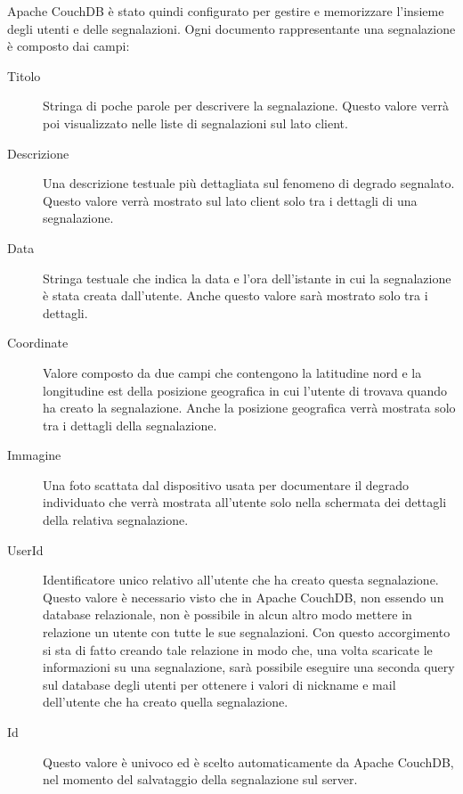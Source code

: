         \noindent Apache CouchDB\texttrademark{} è stato quindi configurato per gestire e
        memorizzare l'insieme degli utenti e delle segnalazioni.
        Ogni documento rappresentante una segnalazione è composto dai campi:
        \begin{description}
            \item[Titolo] Stringa di poche parole per descrivere la segnalazione.
                Questo valore verrà poi visualizzato nelle liste di segnalazioni
                sul lato client.
            \item[Descrizione] Una descrizione testuale più dettagliata sul
                fenomeno di degrado segnalato. Questo valore verrà mostrato sul
                lato client solo tra i dettagli di una segnalazione.
            \item[Data] Stringa testuale che indica la data e l'ora dell'istante
                in cui la segnalazione è stata creata dall'utente. Anche questo
                valore sarà mostrato solo tra i dettagli.
            \item[Coordinate] Valore composto da due campi che contengono la
                latitudine nord e la longitudine est della posizione geografica
                in cui l'utente di trovava quando ha creato la segnalazione. Anche
                la posizione geografica verrà mostrata solo tra i dettagli della
                segnalazione.
            \item[Immagine] Una foto scattata dal dispositivo usata per
                documentare il degrado individuato che verrà mostrata all'utente
                solo nella schermata dei dettagli della relativa segnalazione.
            \item[UserId] Identificatore unico relativo all'utente che ha creato
                questa segnalazione. Questo valore è necessario visto che in
                Apache CouchDB\texttrademark{}, non essendo un database relazionale,
                non è possibile in alcun altro modo mettere in relazione un utente con
                tutte le sue segnalazioni. Con questo accorgimento si sta di fatto
                creando tale relazione in modo che, una volta scaricate le
                informazioni su una segnalazione, sarà possibile eseguire una
                seconda query sul database degli utenti per ottenere i valori
                di nickname e mail dell'utente che ha creato quella segnalazione.
            \item[Id] Questo valore è univoco ed è scelto automaticamente da
                Apache CouchDB\texttrademark{}, nel momento del
                salvataggio della segnalazione sul server.
        \end{description}

